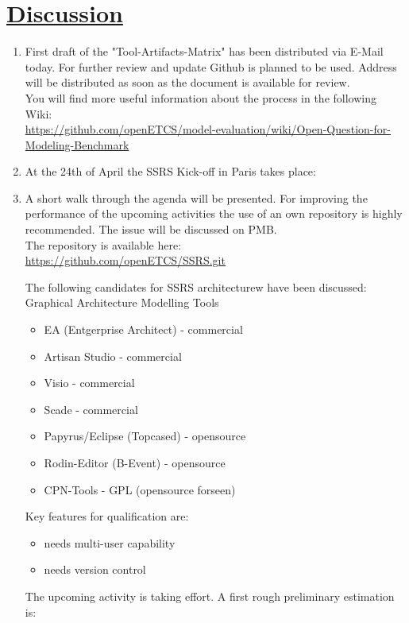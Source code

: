 \documentclass[a4paper]{article}
\begin{document}
\section*{\underline{Discussion}}
\begin{enumerate}
\item First draft of the "Tool-Artifacts-Matrix"
has been distributed via E-Mail today. For further review and update Github is planned to be used. Address will be distributed as soon as the document is available for review.\\
You will find more useful information about the process in the following Wiki:\\
\url{https://github.com/openETCS/model-evaluation/wiki/Open-Question-for-Modeling-Benchmark}

\item At the 24th of April the SSRS Kick-off in Paris takes place:
\item A short walk through the agenda will be presented.
For improving the performance of the upcoming activities the use of an own repository is highly recommended. The issue will be discussed on PMB.\\
The repository is available here:\\
\url{https://github.com/openETCS/SSRS.git}

The following candidates for SSRS architecturew have been discussed:\\
Graphical Architecture Modelling Tools
\begin{itemize}
\item EA (Entgerprise Architect) - commercial
\item Artisan Studio    - commercial
\item Visio      - commercial
\item Scade      - commercial
\item Papyrus/Eclipse (Topcased) - opensource
\item Rodin-Editor (B-Event)  - opensource
\item CPN-Tools     - GPL (opensource forseen)
\end{itemize}

Key features for qualification are:
\begin{itemize}
\item  needs multi-user capability
\item  needs version control
\end{itemize}

The upcoming activity is taking effort. A first rough preliminary estimation is:
 

\end{enumerate}
\end{document}
